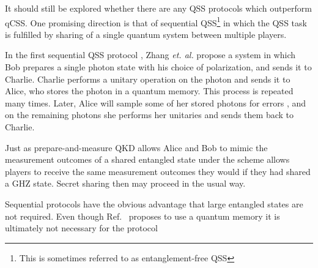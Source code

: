 It should still be explored whether there are any QSS protocols which outperform qCSS. One promising direction is that of sequential QSS\footnote{This is sometimes referred to as entanglement-free QSS} in which the QSS task is fulfilled by sharing of a single quantum system between multiple players.

In the first sequential QSS protocol \cite{Zhang2005}, Zhang \emph{et. al.} propose a system in which Bob prepares a single photon state with his choice of polarization, and sends it to Charlie. Charlie performs a unitary operation  on the photon and sends it to Alice, who stores the photon in a quantum memory. This process is repeated many times. Later, Alice will sample some of her stored photons for errors , and on the remaining photons she performs her unitaries  and sends them back to Charlie. 

Just as prepare-and-measure QKD allows Alice and Bob to mimic the measurement outcomes of a shared entangled state  under  the scheme \cite{Zhang2005} allows players to receive the same measurement outcomes they would if they had shared a GHZ state. Secret sharing then may proceed in the usual way. 

Sequential protocols have the obvious advantage that large entangled states are not required. Even though Ref.~\cite{Zhang2005} proposes to use a quantum memory it is ultimately not necessary for the protocol 



%
%
